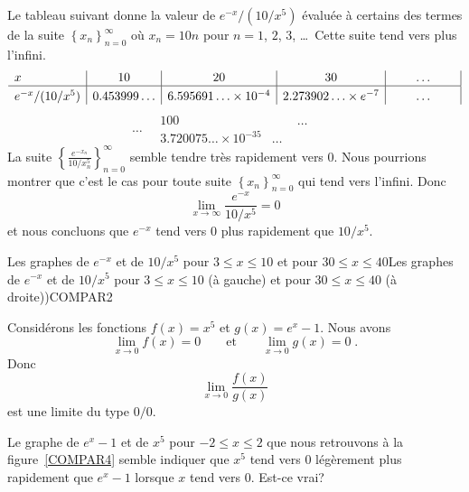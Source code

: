 {\begin{egg}
Le tableau suivant donne la valeur de $e^{-x}/(10/x^5)$ évaluée à
certains des termes de la suite
$\displaystyle \left\{ x_n \right\}_{n=0}^\infty$ où
$x_n = 10n$ pour $n=1$, $2$, $3$, \ldots\  Cette suite tend vers plus
l'infini.
\[
\begin{array}{l|c|c|c|c|}
x & 10 & 20 & 30 & \ldots \\
\hline
\rule[-0.2ex]{0em}{1.2em} e^{-x}/(10/x^5) & 0.453999\ldots &
6.595691\ldots \times 10^{-4} &
2.273902\ldots \times e^{-7} & \qquad \ldots \qquad
\end{array}
\]
\[
\ldots \quad
\begin{array}{|c|c}
100 & \qquad \ldots \qquad \\
\hline
3.720075\ldots \times 10^{-35} & \ldots 
\end{array}
\]
La suite
$\displaystyle \left\{ \frac{e^{-x_n}}{10/x_n^5} \right\}_{n=0}^\infty$
semble tendre très rapidement vers $0$.  Nous pourrions montrer que c'est
le cas pour toute suite
$\displaystyle \left\{ x_n \right\}_{n=0}^\infty$ qui
tend vers l'infini.  Donc
\[
\lim_{x\rightarrow \infty} \frac{e^{-x}}{10/x^5} = 0
\]
et nous concluons que $e^{-x}$ tend vers $0$ plus rapidement que $10/x^5$.
\label{egg_hosp2}
\end{egg}

{Les graphes de $e^{-x}$ et de $10/x^5$ pour $3\leq x \leq 10$ et pour
$30\leq x \leq 40$}{Les graphes de $e^{-x}$ et de $10/x^5$ pour
$3\leq x \leq 10$ (à gauche) et pour $30\leq x \leq 40$ (à
droite))}{COMPAR2}

\begin{egg}
Considérons les fonctions $f(x) = x^5$ et $g(x) = e^x - 1$. Nous avons
\[
\lim_{x\rightarrow 0} f(x) = 0 \qquad \text{et} \qquad
\lim_{x\rightarrow 0} g(x) = 0 \; .
\]
Donc
\begin{equation} \label{lim_00}
\lim_{x \rightarrow 0} \frac{f(x)}{g(x)}
\end{equation}
est une limite du type $0/0$.

Le graphe de $e^x - 1$ et de $x^5$ pour $-2\leq x \leq 2$ que nous
retrouvons à la figure~\ref{COMPAR4} semble indiquer que $x^5$ tend vers
$0$ légèrement plus rapidement que $e^x-1$ lorsque $x$ tend vers $0$.
Est-ce vrai?


\end{egg}}
